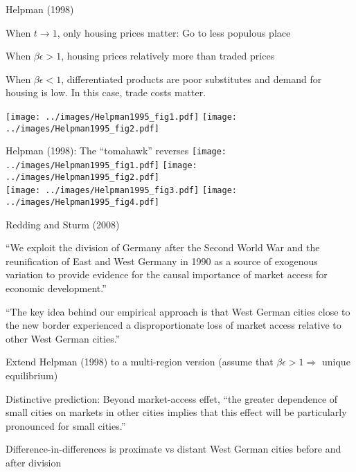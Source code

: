 \documentclass[10pt,notes=hide]{beamer}
\begin{document}
\begin{frame}{Helpman (1998)}
\begin{itemize}
{\small
	\item When $t \to 1$, only housing prices matter: Go to less populous place
	\item When $\beta\epsilon>1$, housing prices relatively more than traded prices
	\item When $\beta\epsilon<1$, differentiated products are poor substitutes and demand for housing is low. In this case, trade costs matter.
}
\end{itemize}
\texttt{[image: ../images/Helpman1995\_fig1.pdf]}
\texttt{[image: ../images/Helpman1995\_fig2.pdf]}
\end{frame}
\begin{frame}{Helpman (1998): The ``tomahawk'' reverses}
\texttt{[image: ../images/Helpman1995\_fig1.pdf]}
\texttt{[image: ../images/Helpman1995\_fig2.pdf]} \\
\texttt{[image: ../images/Helpman1995\_fig3.pdf]}
\texttt{[image: ../images/Helpman1995\_fig4.pdf]}
\end{frame}
\begin{frame}{Redding and Sturm (2008)}
\begin{itemize}
{\small
	\item ``We exploit the division of Germany after the Second World War and the reunification of East and West Germany in 1990 as a source of exogenous variation to provide evidence for the causal importance of market access for economic development.''
	\item ``The key idea behind our empirical approach is that West German cities close to the new border experienced a disproportionate loss of market access relative to other West German cities.''
	\item Extend Helpman (1998) to a multi-region version (assume that $\beta\epsilon>1 \Rightarrow$ unique equilibrium)
	\item Distinctive prediction: Beyond market-access effet, ``the greater dependence of small cities on markets in other cities implies that this effect will be particularly pronounced for small cities.''
	\item Difference-in-differences is proximate vs distant West German cities before and after division
}
\end{itemize}
\end{frame}
\end{document}
